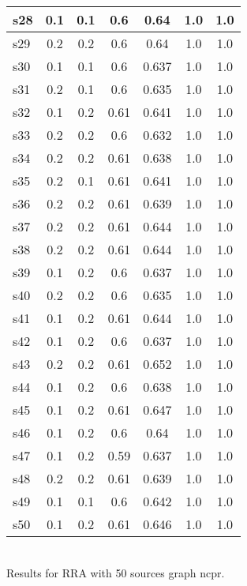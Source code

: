 \documentclass{article}
\begin{document}
\begin{tabular}{|l|c|c|c|c|c|c|}
\hline
s28 &0.1 & 0.1 & 0.6 & 0.64 & 1.0 & 1.0\\
\hline
s29 &0.2 & 0.2 & 0.6 & 0.64 & 1.0 & 1.0\\
\hline
s30 &0.1 & 0.1 & 0.6 & 0.637 & 1.0 & 1.0\\
\hline
s31 &0.2 & 0.1 & 0.6 & 0.635 & 1.0 & 1.0\\
\hline
s32 &0.1 & 0.2 & 0.61 & 0.641 & 1.0 & 1.0\\
\hline
s33 &0.2 & 0.2 & 0.6 & 0.632 & 1.0 & 1.0\\
\hline
s34 &0.2 & 0.2 & 0.61 & 0.638 & 1.0 & 1.0\\
\hline
s35 &0.2 & 0.1 & 0.61 & 0.641 & 1.0 & 1.0\\
\hline
s36 &0.2 & 0.2 & 0.61 & 0.639 & 1.0 & 1.0\\
\hline
s37 &0.2 & 0.2 & 0.61 & 0.644 & 1.0 & 1.0\\
\hline
s38 &0.2 & 0.2 & 0.61 & 0.644 & 1.0 & 1.0\\
\hline
s39 &0.1 & 0.2 & 0.6 & 0.637 & 1.0 & 1.0\\
\hline
s40 &0.2 & 0.2 & 0.6 & 0.635 & 1.0 & 1.0\\
\hline
s41 &0.1 & 0.2 & 0.61 & 0.644 & 1.0 & 1.0\\
\hline
s42 &0.1 & 0.2 & 0.6 & 0.637 & 1.0 & 1.0\\
\hline
s43 &0.2 & 0.2 & 0.61 & 0.652 & 1.0 & 1.0\\
\hline
s44 &0.1 & 0.2 & 0.6 & 0.638 & 1.0 & 1.0\\
\hline
s45 &0.1 & 0.2 & 0.61 & 0.647 & 1.0 & 1.0\\
\hline
s46 &0.1 & 0.2 & 0.6 & 0.64 & 1.0 & 1.0\\
\hline
s47 &0.1 & 0.2 & 0.59 & 0.637 & 1.0 & 1.0\\
\hline
s48 &0.2 & 0.2 & 0.61 & 0.639 & 1.0 & 1.0\\
\hline
s49 &0.1 & 0.1 & 0.6 & 0.642 & 1.0 & 1.0\\
\hline
s50 &0.1 & 0.2 & 0.61 & 0.646 & 1.0 & 1.0\\
\hline
\end{tabular}\\

\noindent Results for RRA with 50 sources graph ncpr.
\end{document}
